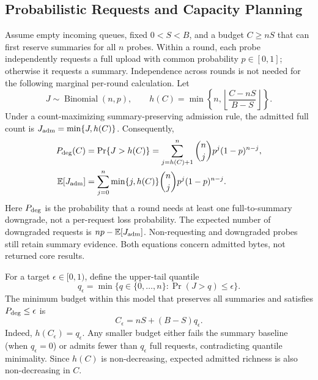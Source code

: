 \documentclass[10pt,onecolumn]{IEEEtran}
\begin{document}
\subsection{Probabilistic Requests and Capacity Planning}
\label{sec:supp_probabilistic}
Assume empty incoming queues, fixed $0<S<B$, and a budget $C\geq nS$ that
can first reserve summaries for all $n$ probes. Within a round, each probe
independently requests a full upload with common probability $p\in[0,1]$;
otherwise it requests a summary. Independence across rounds is not needed
for the following marginal per-round calculation. Let
\begin{equation}
J\sim\operatorname{Binomial}(n,p),\qquad
h(C)=\min\left\{n,\left\lfloor\frac{C-nS}{B-S}\right\rfloor\right\}.
\label{eq:supp_h}
\end{equation}
Under a count-maximizing summary-preserving admission rule, the admitted
full count is $J_{\rm adm}=\min\{J,h(C)\}$. Consequently,
\begin{align}
P_{\rm deg}(C)
&=\Pr\{J>h(C)\}
=\sum_{j=h(C)+1}^{n}\binom{n}{j}p^j(1-p)^{n-j},
\label{eq:supp_pdeg}\\
\mathbb E[J_{\rm adm}]
&=\sum_{j=0}^{n}\min\{j,h(C)\}\binom{n}{j}p^j(1-p)^{n-j}.
\label{eq:supp_expected_admission}
\end{align}
Here $P_{\rm deg}$ is the probability that a round needs at least one
full-to-summary downgrade, not a per-request loss probability. The expected
number of downgraded requests is $np-\mathbb E[J_{\rm adm}]$. Non-requesting
and downgraded probes still retain summary evidence. Both equations concern
admitted bytes, not returned core results.

For a target $\epsilon\in[0,1)$, define the upper-tail quantile
\begin{equation}
q_\epsilon=\min\{q\in\{0,\ldots,n\}:\Pr(J>q)\leq\epsilon\}.
\label{eq:supp_quantile}
\end{equation}
The minimum budget within this model that preserves all summaries and
satisfies $P_{\rm deg}\leq\epsilon$ is
\begin{equation}
\boxed{C_\epsilon=nS+(B-S)q_\epsilon.}
\label{eq:supp_capacity}
\end{equation}
Indeed, $h(C_\epsilon)=q_\epsilon$. Any smaller budget either fails the
summary baseline (when $q_\epsilon=0$) or admits fewer than $q_\epsilon$ full
requests, contradicting quantile minimality. Since $h(C)$ is non-decreasing,
expected admitted richness is also non-decreasing in $C$.
\end{document}
